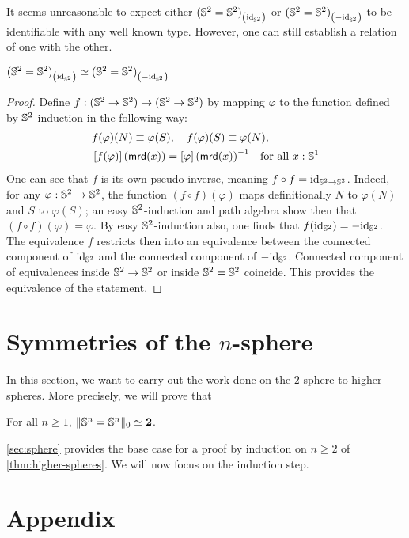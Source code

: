 \documentclass[english,a4]{article}
\renewcommand{\ap}[1]{\left[{#1}\right]}
\newcommand{\setTrunc}[1]{\Trunc{#1}_0}
\begin{document}
It seems unreasonable to expect either ${({{\mathbb S^{2}}} = {{\mathbb S^{2}}})}_{\left(\mathord{\mathrm{id}}_{{\mathbb S^{2}}}\right)}$ or
${({{\mathbb S^{2}}} = {{\mathbb S^{2}}})}_{\left(-\mathord{\mathrm{id}}_{{\mathbb S^{2}}}\right)}$ to be identifiable with any well known type.
However, one can still establish a relation of one with the other.
\begin{proposition}
  ${({{\mathbb S^{2}}} = {{\mathbb S^{2}}})}_{\left(\mathord{\mathrm{id}}_{{\mathbb S^{2}}}\right)} \simeq {({{\mathbb S^{2}}}= {{\mathbb S^{2}}})}_{\left(-\mathord{\mathrm{id}}_{{\mathbb S^{2}}}\right)}$
  \label{prop:S2-components-are-equiv}
\end{proposition}
\begin{proof}
  Define $f:{({{\mathbb S^{2}}} \to {{\mathbb S^{2}}})} \to ({{\mathbb S^{2}}} \to {{\mathbb S^{2}}})$ by mapping
  $\varphi$ to the function defined by ${{\mathbb S^{2}}}$-induction in the following way:
  \begin{align*}
    &f(\varphi)(N) \jdeq \varphi(S), \quad f(\varphi)(S) \jdeq \varphi(N),\\
    &\ap{f(\varphi)}(\mrd(x)) = \inv{\ap{\varphi}(\mrd(x))}\quad \text{for all}\ x:\Sc
  \end{align*}
  One can see that $f$ is its own pseudo-inverse, meaning $f\circ f = \mathord{\mathrm{id}}_{{{\mathbb S^{2}}}
  \to {{\mathbb S^{2}}}}$. Indeed, for any $\varphi:{{\mathbb S^{2}}} \to {{\mathbb S^{2}}}$, the function $(f\circ
  f)(\varphi)$ maps definitionally $N$ to $\varphi(N)$ and $S$ to $\varphi(S)$;
  an easy ${{\mathbb S^{2}}}$-induction and path algebra show then that $(f\circ f)
  (\varphi) = \varphi$.
  By easy ${{\mathbb S^{2}}}$-induction also, one finds that $f(\mathord{\mathrm{id}}_{{\mathbb S^{2}}}) = -\mathord{\mathrm{id}}_{{\mathbb S^{2}}}$. The
  equivalence $f$ restricts then into an equivalence between the connected
  component of $\mathord{\mathrm{id}}_{{\mathbb S^{2}}}$ and the connected component of $-\mathord{\mathrm{id}}_{{\mathbb S^{2}}}$. Connected
  component of equivalences inside ${{\mathbb S^{2}}}\to{{\mathbb S^{2}}}$ or inside ${{\mathbb S^{2}}}={{\mathbb S^{2}}}$ coincide.
  This provides the equivalence of the statement.
\end{proof}

\section{Symmetries of the $n$-sphere}
\label{sec:higher-sphere}

In this section, we want to carry out the work done on the $2$-sphere to higher
spheres. More precisely, we will prove that
\begin{theorem}
  \label{thm:higher-spheres}
  For all $n\geq 1$, $\setTrunc{\Sn n = \Sn n} \weq \bn 2$.
\end{theorem}
%

\cref{sec:sphere} provides the base case for a proof by induction on $n \geq 2$
of \cref{thm:higher-spheres}. We will now focus on the induction step. 


\section{Appendix}
\label{sec:appendix}
\end{document}
